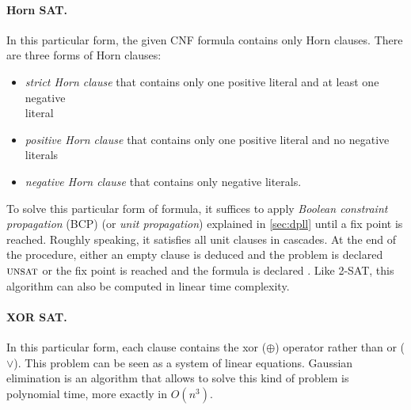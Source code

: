 
\paragraph{Horn SAT\cite{dowling1984linear}.} In this particular form, the given CNF formula contains only Horn clauses. 
There are three forms of Horn clauses: 
\begin{itemize}[topsep=0pt,itemsep=1pt]
\item \emph{strict Horn clause} that contains only one positive literal and at least one negative \\literal
\item \emph{positive Horn clause} that contains only one positive literal and no negative literals
\item \emph{negative Horn clause} that contains only negative literals.
\end{itemize}
To solve this particular form of formula, it suffices to  apply \emph{Boolean constraint propagation} (BCP) (or \emph{unit propagation}) explained in \cref{sec:dpll} until a fix point
is reached.
Roughly speaking, it satisfies all unit clauses in cascades. At the end of the procedure, either an empty clause is deduced and the problem
is declared $\textsc{unsat}$ or the fix point is reached and the formula is declared \sat.
 Like 2-SAT, this algorithm can also be computed in linear time complexity.
 
\paragraph{XOR SAT\cite{moore2011nature}.} In this particular form, each clause contains the xor ($\oplus$) operator rather than or ($\lor$).
This problem can be seen as a system of linear equations. Gaussian elimination is an algorithm that allows to solve this kind of
problem is polynomial time, more exactly in $O(n^3)$.

